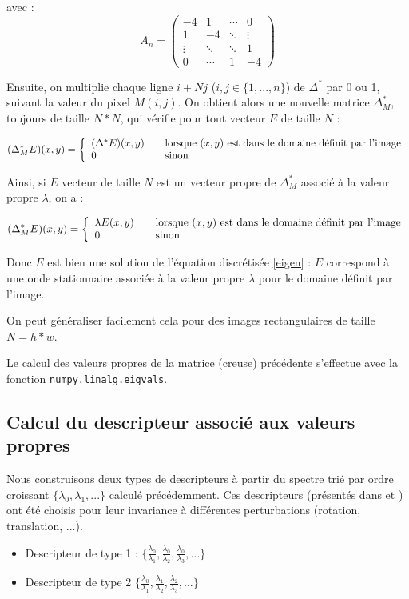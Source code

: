 \documentclass[a4paper,10pt]{article} %
\theoremstyle{definition} %
\begin{document}
avec : $$A_n =  
\begin{pmatrix}
  -4 & 1 & \cdots & 0 \\
  1  & -4 & \ddots &   \vdots \\
  \vdots  & \ddots  & \ddots & 1  \\
  0 & \cdots  & 1 & -4
 \end{pmatrix}  $$

Ensuite, on multiplie chaque ligne $i+Nj$ ($i, j \in \{1, ..., n\}$) de $\Delta^*$ par 0 ou 1, suivant la valeur du pixel $M(i,j)$. On obtient alors une nouvelle matrice $\Delta^*_M$, toujours de taille $N*N$, qui vérifie pour tout vecteur $E$ de taille $N$ : 

\[ (\Delta^*_M E)(x,y) = \left\{ 
  \begin{array}{l l}
    (\Delta^* E)(x,y) & \quad \text{lorsque }(x,y) \text{ est dans le domaine définit par l'image}\\
    0 & \quad \text{sinon}
  \end{array} \right.\]
  
  
  Ainsi, si $E$ vecteur de taille $N$ est un vecteur propre de $\Delta^*_M$ associé à la valeur propre $\lambda$, on a : 
  
  \[ (\Delta^*_M E)(x,y) = \left\{ 
  \begin{array}{l l}
    \lambda E(x,y) & \quad \text{lorsque }(x,y) \text{ est dans le domaine définit par l'image}\\
    0 & \quad \text{sinon}
  \end{array} \right.\]
  
 Donc $E$ est bien une solution de l'équation discrétisée \eqref{eigen} : $E$ correspond à une onde stationnaire associée à la valeur propre $\lambda$ pour le domaine définit par l'image.
  
 On peut généraliser facilement cela pour des images rectangulaires de taille $N = h*w$.
  
 Le calcul des valeurs propres de la matrice (creuse) précédente s'effectue avec la fonction \texttt{numpy.linalg.eigvals}.
  

  \subsection{Calcul du descripteur associé aux valeurs propres}

Nous construisons deux types de descripteurs à partir du spectre trié par ordre croissant $\{\lambda_0, \lambda_1, ...\}$ calculé précédemment. Ces descripteurs (présentés dans \cite{Zuliani04} et \cite{KhabouHR07}) ont été choisis pour leur invariance à différentes perturbations (rotation, translation, ...).
\begin{itemize}
\item Descripteur de type 1 : $\{\frac{\lambda_0}{\lambda_1}, \frac{\lambda_0}{\lambda_2}, \frac{\lambda_0}{\lambda_3}, ... \}$
\item Descripteur de type 2 $\{\frac{\lambda_0}{\lambda_1}, \frac{\lambda_1}{\lambda_2}, \frac{\lambda_2}{\lambda_3},...\}$
\end{itemize}
\end{document}
